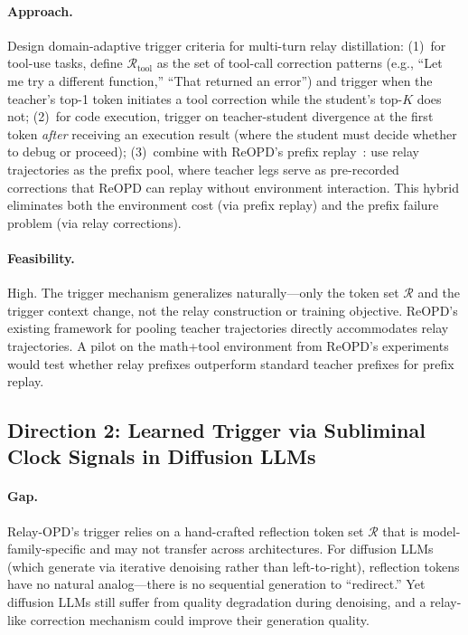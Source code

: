 \documentclass[11pt,a4paper]{article}
\begin{document}
\paragraph{Approach.}
Design domain-adaptive trigger criteria for multi-turn relay distillation: (1)~for tool-use tasks, define $\mathcal{R}_{\text{tool}}$ as the set of tool-call correction patterns (e.g., ``Let me try a different function,'' ``That returned an error'') and trigger when the teacher's top-1 token initiates a tool correction while the student's top-$K$ does not; (2)~for code execution, trigger on teacher-student divergence at the first token \emph{after} receiving an execution result (where the student must decide whether to debug or proceed); (3)~combine with ReOPD's prefix replay~\cite{liao2026multiturn}: use relay trajectories as the prefix pool, where teacher legs serve as pre-recorded corrections that ReOPD can replay without environment interaction. This hybrid eliminates both the environment cost (via prefix replay) and the prefix failure problem (via relay corrections).

\paragraph{Feasibility.}
High. The trigger mechanism generalizes naturally---only the token set $\mathcal{R}$ and the trigger context change, not the relay construction or training objective. ReOPD's existing framework for pooling teacher trajectories directly accommodates relay trajectories. A pilot on the math+tool environment from ReOPD's experiments would test whether relay prefixes outperform standard teacher prefixes for prefix replay.

\subsection{Direction 2: Learned Trigger via Subliminal Clock Signals in Diffusion LLMs}

\paragraph{Gap.}
Relay-OPD's trigger relies on a hand-crafted reflection token set $\mathcal{R}$ that is model-family-specific and may not transfer across architectures. For diffusion LLMs (which generate via iterative denoising rather than left-to-right), reflection tokens have no natural analog---there is no sequential generation to ``redirect.'' Yet diffusion LLMs still suffer from quality degradation during denoising, and a relay-like correction mechanism could improve their generation quality.
\end{document}
